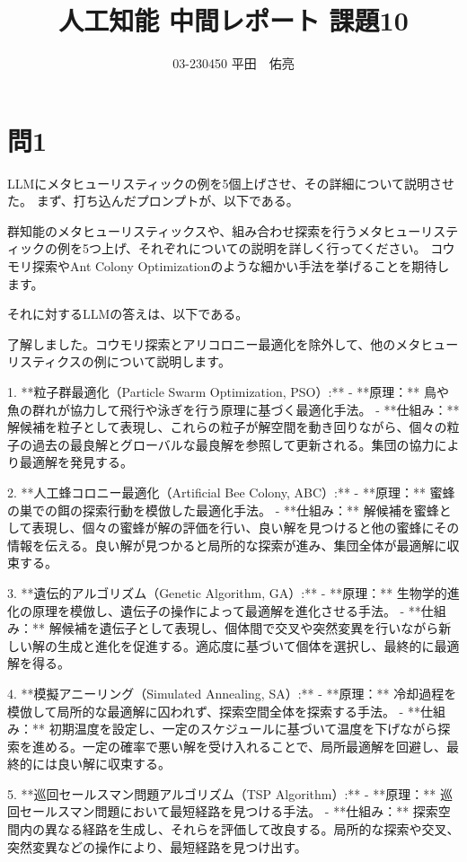 \documentclass[11pt, twocolumn]{ltjsarticle}
\begin{document}
\title{人工知能 中間レポート 課題10}
\author{03-230450 平田　佑亮\\}
\maketitle

\section{問1}
LLMにメタヒューリスティックの例を5個上げさせ、その詳細について説明させた。
まず、打ち込んだプロンプトが、以下である。

群知能のメタヒューリスティックスや、組み合わせ探索を行うメタヒューリスティックの例を5つ上げ、それぞれについての説明を詳しく行ってください。
コウモリ探索やAnt Colony Optimizationのような細かい手法を挙げることを期待します。

それに対するLLMの答えは、以下である。

了解しました。コウモリ探索とアリコロニー最適化を除外して、他のメタヒューリスティクスの例について説明します。

1. **粒子群最適化（Particle Swarm Optimization, PSO）:**
   - **原理：** 鳥や魚の群れが協力して飛行や泳ぎを行う原理に基づく最適化手法。
   - **仕組み：** 解候補を粒子として表現し、これらの粒子が解空間を動き回りながら、個々の粒子の過去の最良解とグローバルな最良解を参照して更新される。集団の協力により最適解を発見する。

2. **人工蜂コロニー最適化（Artificial Bee Colony, ABC）:**
   - **原理：** 蜜蜂の巣での餌の探索行動を模倣した最適化手法。
   - **仕組み：** 解候補を蜜蜂として表現し、個々の蜜蜂が解の評価を行い、良い解を見つけると他の蜜蜂にその情報を伝える。良い解が見つかると局所的な探索が進み、集団全体が最適解に収束する。

3. **遺伝的アルゴリズム（Genetic Algorithm, GA）:**
   - **原理：** 生物学的進化の原理を模倣し、遺伝子の操作によって最適解を進化させる手法。
   - **仕組み：** 解候補を遺伝子として表現し、個体間で交叉や突然変異を行いながら新しい解の生成と進化を促進する。適応度に基づいて個体を選択し、最終的に最適解を得る。

4. **模擬アニーリング（Simulated Annealing, SA）:**
   - **原理：** 冷却過程を模倣して局所的な最適解に囚われず、探索空間全体を探索する手法。
   - **仕組み：** 初期温度を設定し、一定のスケジュールに基づいて温度を下げながら探索を進める。一定の確率で悪い解を受け入れることで、局所最適解を回避し、最終的には良い解に収束する。

5. **巡回セールスマン問題アルゴリズム（TSP Algorithm）:**
   - **原理：** 巡回セールスマン問題において最短経路を見つける手法。
   - **仕組み：** 探索空間内の異なる経路を生成し、それらを評価して改良する。局所的な探索や交叉、突然変異などの操作により、最短経路を見つけ出す。
\end{document}
